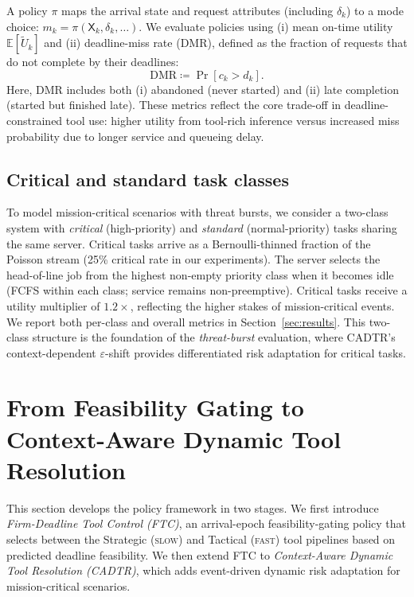 \documentclass[preprint,12pt]{elsarticle}
\begin{document}
A policy $\pi$ maps the arrival state and request attributes (including $\delta_k$) to a mode choice: $m_k = \pi(\mathsf{X}_k, \delta_k, \ldots)$. We evaluate policies using (i) mean on-time utility $\mathbb{E}[\tilde{U}_k]$ and (ii) deadline-miss rate (DMR), defined as the fraction of requests that do not complete by their deadlines:
\begin{equation}
\mathrm{DMR} \coloneqq \Pr[c_k > d_k].
\end{equation}
Here, DMR includes both (i) abandoned (never started) and (ii) late completion (started but finished late). These metrics reflect the core trade-off in deadline-constrained tool use: higher utility from tool-rich inference versus increased miss probability due to longer service and queueing delay.

\subsection{Critical and standard task classes}
\label{sec:premium_extension}

To model mission-critical scenarios with threat bursts, we consider a two-class system with \emph{critical} (high-priority) and \emph{standard} (normal-priority) tasks sharing the same server. Critical tasks arrive as a Bernoulli-thinned fraction of the Poisson stream (25\% critical rate in our experiments). The server selects the head-of-line job from the highest non-empty priority class when it becomes idle (FCFS within each class; service remains non-preemptive). Critical tasks receive a utility multiplier of $1.2\times$, reflecting the higher stakes of mission-critical events. We report both per-class and overall metrics in Section~\ref{sec:results}. This two-class structure is the foundation of the \emph{threat-burst} evaluation, where CADTR's context-dependent $\varepsilon$-shift provides differentiated risk adaptation for critical tasks.

\section{From Feasibility Gating to Context-Aware Dynamic Tool Resolution}
\label{sec:tfg}

This section develops the policy framework in two stages. We first introduce \emph{Firm-Deadline Tool Control (FTC)}, an arrival-epoch feasibility-gating policy that selects between the Strategic (\textsc{slow}) and Tactical (\textsc{fast}) tool pipelines based on predicted deadline feasibility. We then extend FTC to \emph{Context-Aware Dynamic Tool Resolution (CADTR)}, which adds event-driven dynamic risk adaptation for mission-critical scenarios.
\end{document}
